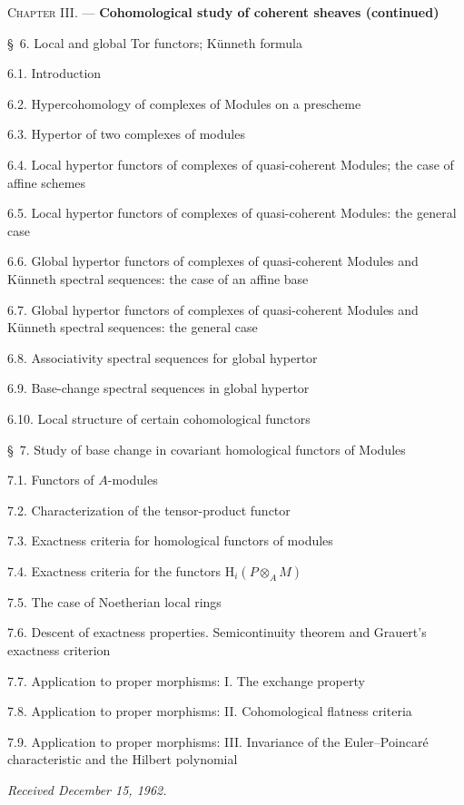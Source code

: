 \documentclass[10pt,oneside]{book}
\begin{document}
\begin{flushleft}
\textsc{Chapter III.} --- \textbf{Cohomological study of coherent sheaves
(continued)} 

\medskip
\S~6. Local and global Tor functors; Künneth formula 

6.1. Introduction 

6.2. Hypercohomology of complexes of Modules on a prescheme 

6.3. Hypertor of two complexes of modules 

6.4. Local hypertor functors of complexes of quasi-coherent Modules; the case
of affine schemes 

6.5. Local hypertor functors of complexes of quasi-coherent Modules: the
general case 

6.6. Global hypertor functors of complexes of quasi-coherent Modules and
Künneth spectral sequences: the case of an affine base 

6.7. Global hypertor functors of complexes of quasi-coherent Modules and
Künneth spectral sequences: the general case 

6.8. Associativity spectral sequences for global hypertor 

6.9. Base-change spectral sequences in global hypertor 

6.10. Local structure of certain cohomological functors 

\medskip
\S~7. Study of base change in covariant homological functors of Modules

7.1. Functors of $A$-modules 

7.2. Characterization of the tensor-product functor 

7.3. Exactness criteria for homological functors of modules 

7.4. Exactness criteria for the functors $\mathrm H_i(P\otimes_A M)$

7.5. The case of Noetherian local rings 

7.6. Descent of exactness properties. Semicontinuity theorem and Grauert's
exactness criterion 

7.7. Application to proper morphisms: I. The exchange property 

7.8. Application to proper morphisms: II. Cohomological flatness criteria

7.9. Application to proper morphisms: III. Invariance of the Euler--Poincaré
characteristic and the Hilbert polynomial 

\begin{flushright}
\emph{Received December 15, 1962.}
\end{flushright}
\end{flushleft}
\end{document}
